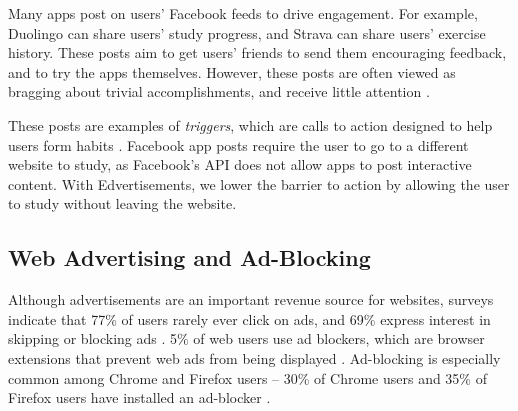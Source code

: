 \documentclass{sigchi}
\begin{document}

Many apps post on users' Facebook feeds to drive engagement. %
For example, Duolingo can share users' study progress, and Strava can share users' exercise history.
These posts aim to get users' friends to send them encouraging feedback, and to try the apps themselves.
However, these posts are often viewed as bragging about trivial accomplishments, and receive little attention \cite{socialsharing}. %

These posts are examples of \textit{triggers}, which are calls to action designed to help users form habits \cite{foggpersuasive}. Facebook app posts require the user to go to a different website to study, as Facebook's API does not allow apps to post interactive content. With Edvertisements, we lower the barrier to action by allowing the user to study without leaving the website.


\pagebreak

\subsection{Web Advertising and Ad-Blocking}

Although advertisements are an important revenue source for websites, surveys indicate that 77\% of users rarely ever click on ads, and 69\% express interest in skipping or blocking ads \cite{adblockinggames}. 5\% of web users use ad blockers, which are browser extensions that prevent web ads from being displayed \cite{adblockinggoesmainstream}. Ad-blocking is especially common among Chrome and Firefox users -- 30\% of Chrome users and 35\% of Firefox users have installed an ad-blocker \cite{adblockinggoesmainstream}.
\end{document}
